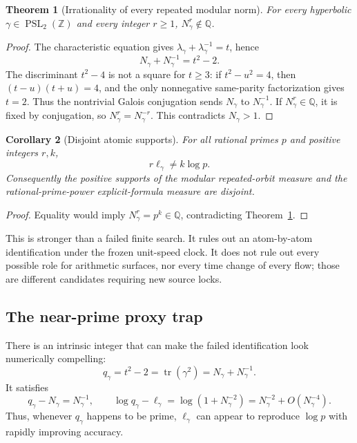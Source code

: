 \documentclass[11pt]{article}
\newtheorem{theorem}{Theorem}
\newtheorem{corollary}[theorem]{Corollary}
\theoremstyle{definition}
\theoremstyle{remark}
\newcommand{\PSL}{\operatorname{PSL}}
\newcommand{\Tr}{\operatorname{tr}}
\newcommand{\Q}{\mathbb{Q}}
\newcommand{\Z}{\mathbb{Z}}
\begin{document}
\begin{theorem}[Irrationality of every repeated modular norm]
\label{thm:irrational}
For every hyperbolic \(\gamma\in\PSL_2(\Z)\) and every integer \(r\ge1\),
\(N_\gamma^r\notin\Q\).
\end{theorem}

\begin{proof}
The characteristic equation gives
\(\lambda_\gamma+\lambda_\gamma^{-1}=t\), hence
\begin{equation}
 N_\gamma+N_\gamma^{-1}=t^2-2.
 \label{eq:normidentity}
\end{equation}
The discriminant \(t^2-4\) is not a square for \(t\ge3\): if
\(t^2-u^2=4\), then \((t-u)(t+u)=4\), and the only nonnegative
same-parity factorization gives \(t=2\).  Thus the nontrivial Galois
conjugation sends \(N_\gamma\) to \(N_\gamma^{-1}\).  If
\(N_\gamma^r\in\Q\), it is fixed by conjugation, so
\(N_\gamma^r=N_\gamma^{-r}\).  This contradicts \(N_\gamma>1\).
\end{proof}

\begin{corollary}[Disjoint atomic supports]
\label{cor:support}
For all rational primes \(p\) and positive integers \(r,k\),
\[
 r\ell_\gamma\ne k\log p.
\]
Consequently the positive supports of the modular repeated-orbit measure and
the rational-prime-power explicit-formula measure are disjoint.
\end{corollary}

\begin{proof}
Equality would imply \(N_\gamma^r=p^k\in\Q\), contradicting
Theorem~\ref{thm:irrational}.
\end{proof}

This is stronger than a failed finite search.  It rules out an atom-by-atom
identification under the frozen unit-speed clock.  It does not rule out every
possible role for arithmetic surfaces, nor every time change of every flow;
those are different candidates requiring new source locks.

\subsection{The near-prime proxy trap}

There is an intrinsic integer that can make the failed identification look
numerically compelling:
\begin{equation}
 q_\gamma=t^2-2=\Tr(\gamma^2)
 =N_\gamma+N_\gamma^{-1}.
 \label{eq:qproxy}
\end{equation}
It satisfies
\begin{equation}
 q_\gamma-N_\gamma=N_\gamma^{-1},\qquad
 \log q_\gamma-\ell_\gamma=\log(1+N_\gamma^{-2})
 =N_\gamma^{-2}+O(N_\gamma^{-4}).
 \label{eq:proxyerror}
\end{equation}
Thus, whenever \(q_\gamma\) happens to be prime, \(\ell_\gamma\) can appear
to reproduce \(\log p\) with rapidly improving accuracy.
\end{document}
